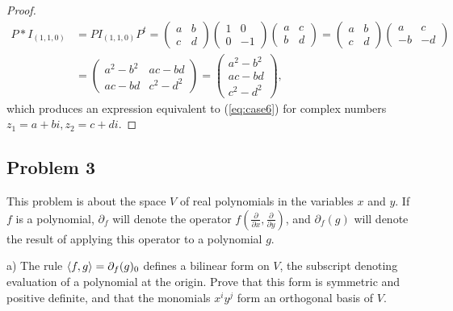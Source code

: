 \documentclass{article}
\theoremstyle{definition}
\DeclarePairedDelimiter\bilform{\langle}{\rangle}
\begin{document}
\begin{proof}

\begin{align*}
	P * I_{(1,1,0)} & =
	P I_{(1,1,0)} P^t =
	\begin{pmatrix}
		a & b \\
		c & d
	\end{pmatrix}
	\begin{pmatrix}
		1 & 0 \\
		0 & -1
	\end{pmatrix}
	\begin{pmatrix}
		a & c \\
		b & d
	\end{pmatrix}
	=
	\begin{pmatrix}
		a & b \\
		c & d
	\end{pmatrix}
	\begin{pmatrix}
		a & c \\
		-b & -d
	\end{pmatrix}
	\\
	& =
	\begin{pmatrix}
		a^2-b^2 & ac-bd \\
		ac-bd & c^2-d^2
	\end{pmatrix}
	=
	\begin{pmatrix}
    	a^2-b^2 \\
    	ac-bd \\
    	c^2-d^2
	\end{pmatrix},
\end{align*}
which produces an expression equivalent to (\ref{eq:case6}) for complex numbers $z_1 = a+bi, z_2 = c+di$.

\end{proof}


\subsection*{Problem 3}

\begin{tcolorbox}
This problem is about the space $V$ of real polynomials in the variables $x$ and $y$.
If $f$ is a polynomial, $\partial_f$ will denote the operator 
$f \left( \frac{\partial}{\partial x}, \frac{\partial}{\partial y} \right)$,
and $\partial_f(g)$ will denote the result of applying this operator to a polynomial $g$.

a) The rule $\bilform{f,g} = \partial_f(g)_0$ defines a bilinear form on $V$, the subscript denoting evaluation of a polynomial at the origin.
Prove that this form is symmetric and positive definite, and that the monomials $x^i y^j$ form an orthogonal basis of $V$.
\end{tcolorbox}
\end{document}
